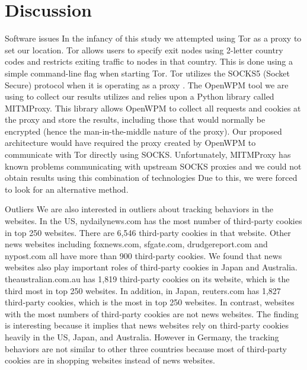 \documentclass[journal]{IEEEtran}
\begin{document}
\section{Discussion}
Software issues
In the infancy of this study we attempted using Tor as a proxy to set our location. Tor allows users to specify exit nodes using 2-letter country codes and restricts exiting traffic to nodes in that country. This is done using a simple command-line flag when starting Tor. Tor utilizes the SOCKS5 (Socket Secure) protocol when it is operating as a proxy \cite{torsocks5}. The OpenWPM tool we are using to collect our results utilizes and relies upon a Python library called MITMProxy. This library allows OpenWPM to collect all requests and cookies at the proxy and store the results, including those that would normally be encrypted (hence the man-in-the-middle nature of the proxy). Our proposed architecture would have required the proxy created by OpenWPM to communicate with Tor directly using SOCKS. Unfortunately, MITMProxy has known problems communicating with upstream SOCKS proxies and we could not obtain results using this combination of technologies \cite{MITM} Due to this, we were forced to look for an alternative method.

Outliers
We are also interested in outliers about tracking behaviors in the websites. In the US, nydailynews.com has the most number of third-party cookies in top 250 websites. There are 6,546 third-party cookies in that website. Other news websites including foxnews.com, sfgate.com, drudgereport.com and nypost.com all have more than 900 third-party cookies. We found that news websites also play important roles of third-party cookies in Japan and Australia. theaustralian.com.au has 1,819 third-party cookies on its website, which is the third most in top 250 websites. In addition, in Japan, reuters.com has 1,827 third-party cookies, which is the most in top 250 websites.  In contrast, websites with the most numbers of third-party cookies are not news websites. The finding is interesting because it implies that news websites rely on third-party cookies heavily in the US, Japan, and Australia. However in Germany, the tracking behaviors are not similar to other three countries because most of third-party cookies are in shopping websites instead of news websites.  
\end{document}
